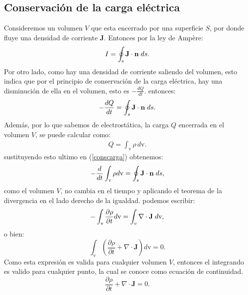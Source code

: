 \documentclass[11pt,fleqn]{book} %
\begin{document}
\subsection{Conservaci\'on de la carga el\'ectrica}
Consideremos un volumen $V$ que esta encerrado por una superficie $S$, por donde fluye una densidad de corriente $\textbf{J}$.
Entonces por la ley de Ampère:
\begin{equation}
I=\oint_{\text{s}} \textbf{J} \cdot \textbf{n} \hspace{1mm} ds.
\end{equation}
Por otro lado, como hay una densidad de corriente saliendo del volumen, esto indica que por el principio de conservaci\'on de la carga el\'ectrica, hay una disminuci\'on de ella en el volumen, esto es $-\frac{dQ}{dt}$. entonces:\\
\begin{equation}
-\frac{dQ}{dt}=\oint_{s} \textbf{J} \cdot \textbf{n}  \hspace{1mm} ds.  \label{conscarga}
\end{equation}
Adem\'as, por lo que sabemos de electrost\'atica, la carga $Q$ encerrada en el volumen $V$, se puede calcular como:\\
\begin{eqnarray*}
Q=\int_{\text{v}} \rho \, d\text{v}.
\end{eqnarray*}
sustituyendo esto ultimo en (\ref{conscarga}) obtenemos:
\begin{equation}
-\frac{d}{dt} \int_{\text{v}} \rho d\text{v}=\oint_{s} \textbf{J} \cdot \textbf{n} \hspace{1mm} ds,
\end{equation}
como el volumen $V$, no cambia en el tiempo y aplicando el teorema de la divergencia en el lado derecho de la igualdad. podemos escribir:
\begin{equation}
- \int_{\text{v}} \frac{\partial \rho}{\partial t} d\text{v}=\int_{v} \nabla \cdot \textbf{J} \hspace{1mm} d\text{v},
\end{equation}
o bien:
\begin{equation}
\int_{\text{v}} \left( \frac{\partial \rho}{\partial t} + \nabla \cdot \textbf{J} \right)   d\text{v}=0.
\end{equation}
Como esta expresi\'on es valida para cualquier volumen $V$, entonces el integrando es valido para cualquier punto, la cual se conoce como ecuaci\'on de continuidad.  \cite{Griffiths1999}
\begin{equation}
 \frac{\partial \rho}{\partial t} + \nabla \cdot \textbf{J}=0.  \label{continuidad}
 \end{equation}
\end{document}
